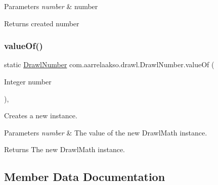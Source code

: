 \begin{DoxyParams}{Parameters}
{\em number} & number \\
\hline
\end{DoxyParams}
\begin{DoxyReturn}{Returns}
created number 
\end{DoxyReturn}
\mbox{\label{classcom_1_1aarrelaakso_1_1drawl_1_1_drawl_number_a324b35d06d6b76c7b1cfe2eaba7115c7}} 
\subsubsection{\texorpdfstring{value\+Of()}{valueOf()}\hspace{0.1cm}{\footnotesize\ttfamily [4/4]}}
{\footnotesize\ttfamily static \hyperlink{classcom_1_1aarrelaakso_1_1drawl_1_1_drawl_number}{Drawl\+Number} com.\+aarrelaakso.\+drawl.\+Drawl\+Number.\+value\+Of (\begin{DoxyParamCaption}\item[{Integer}]{number }\end{DoxyParamCaption})\hspace{0.3cm}{\ttfamily [static]}, {\ttfamily [protected]}}



Creates a new instance. 


\begin{DoxyParams}{Parameters}
{\em number} & The value of the new Drawl\+Math instance. \\
\hline
\end{DoxyParams}
\begin{DoxyReturn}{Returns}
The new Drawl\+Math instance. 
\end{DoxyReturn}


\subsection{Member Data Documentation}
\mbox{\label{classcom_1_1aarrelaakso_1_1drawl_1_1_drawl_number_ae0980b8dd35b0bb52b87b37700d15322}} 
